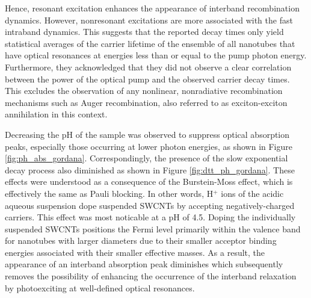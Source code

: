 Hence, resonant excitation enhances the appearance of interband recombination dynamics. However, nonresonant excitations are more associated with the fast intraband dynamics. This suggests that the reported decay times only yield statistical averages of the carrier lifetime of the ensemble of all nanotubes that have optical resonances at energies less than or equal to the pump photon energy. Furthermore, they acknowledged that they did not observe a clear correlation between the power of the optical pump and the observed carrier decay times. This excludes the observation of any nonlinear, nonradiative recombination mechanisms such as Auger recombination, also referred to as exciton-exciton annihilation in this context.



Decreasing the pH of the sample was observed to suppress optical absorption peaks, especially those occurring at lower photon energies, as shown in Figure \ref{fig:ph_abs_gordana}. Correspondingly, the presence of the slow exponential decay process also diminished as shown in Figure \ref{fig:dtt_ph_gordana}. These effects were understood as a consequence of the Burstein-Moss effect, which is effectively the same as Pauli blocking. In other words, H$^+$ ions of the acidic aqueous suspension dope suspended SWCNTs by accepting negatively-charged carriers. This effect was most noticable at a pH of 4.5. Doping the individually suspended SWCNTs positions the Fermi level primarily within the valence band for nanotubes with larger diameters due to their smaller acceptor binding energies associated with their smaller effective masses.  As a result, the appearance of an interband absorption peak diminishes which subsequently removes the possibility of enhancing the occurrence of the interband relaxation by photoexciting at well-defined optical resonances.

\vspace{3cm}

